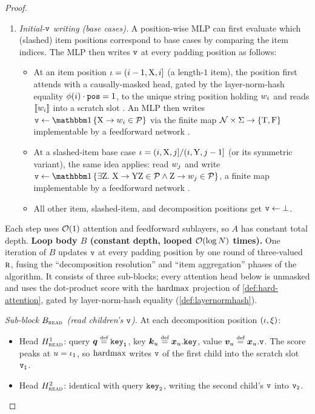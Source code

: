 \documentclass{article}
\begin{document}
\begin{proof}
\begin{enumerate}[noitemsep,topsep=0pt,leftmargin=18pt,parsep=0pt]
        \item \emph{Initial-${\mathtt{v}}$ writing (base cases).} 
        A position-wise MLP can first evaluate which (slashed) item positions correspond to base cases by comparing the item indices. The MLP then writes ${\mathtt{v}}$ at every padding position as follows:
        \begin{itemize}[noitemsep,topsep=0pt,leftmargin=15pt,parsep=0pt]
            \item At an item position ${{ \iota}} = ({{ i}} - 1, {{ \mathrm{X}}}, {{ i}}]$ (a length-$1$ item), the position first attends with a causally-masked head, gated by the layer-norm-hash equality $\phi({{ i}}) \cdot {\mathtt{pos}} = 1$, to the unique string position holding ${w}_{{ i}}$ and reads ${{ \llbracket{w}_{{ i}}\rrbracket}}$ into a scratch slot \citep{merrill2024expressivepowertransformerschain}. An MLP then writes $\fv \gets \ind{\production{\NT{X}}{\sym_\idxi} \in \rules}$ via the finite map ${{ \mathcal{N}}} \times {{ \Sigma}} \to {{\{ {\mathbin{\mathrm{T}}}, {\mathbin{\mathrm{F}}}\}}}$ implementable by a feedforward network \citep{yang2025transformercookbook}.
            \item At a slashed-item base case ${{ \iota}} = ({{ i}}, {{ \mathrm{X}}}, {{ j}}] / ({{ i}}, {{ \mathrm{Y}}}, {{ j}} - 1]$ (or its symmetric variant), the same idea applies: read ${w}_{{ j}}$ and write $\fv \gets \ind{\exists \NT{Z}.\ \production{\NT{X}}{\NT{Y}\NT{Z}} \in \rules \land \production{\NT{Z}}{\sym_\idxj} \in \rules}$, a finite map implementable by a feedforward network \citep{yang2025transformercookbook}.
            \item All other item, slashed-item, and decomposition positions get ${\mathtt{v}} \gets \bot$.
        \end{itemize}
    \end{enumerate}
    Each step uses ${{ \mathcal{O}}}(1)$ attention and feedforward sublayers, so $A$ has constant total depth.
        \textbf{Loop body $B$ (constant depth, looped ${{ \mathcal{O}}}(\log {{ N}})$ times).}
        One iteration of $B$ updates ${\mathtt{v}}$ at every padding position by one round of three-valued ${\textsc{r}}$, fusing the ``decomposition resolution'' and ``item aggregation'' phases of the algorithm.
        It consists of three sub-blocks; every attention head below is unmasked and uses the dot-product score with the ${{\mathrm{hardmax}}}$ projection of \cref{def:hard-attention}, gated by layer-norm-hash equality (\cref{def:layernormhash}).
        
        \emph{Sub-block $B_{\textsc{read}}$ (read children's ${\mathtt{v}}$).}
        At each decomposition position $({{ \iota}}, {{\xi}})$:
        \begin{itemize}[noitemsep,topsep=0pt,leftmargin=15pt,parsep=0pt]
            \item Head $H^1_{\textsc{read}}$: query $\vq \defeq \fkeychildone$, key $\vk_u \defeq \vx_u.\fkeyself$, value $\vv_u \defeq \vx_u.\fv$. The score peaks at $u = {{ \iota}}_1$, so ${{\mathrm{hardmax}}}$ writes ${\mathtt{v}}$ of the first child into the scratch slot ${\mathtt{v}_\mathtt{1}}$.
            \item Head $H^2_{\textsc{read}}$: identical with query ${\mathtt{key}_\mathtt{2}}$, writing the second child's ${\mathtt{v}}$ into ${\mathtt{v}_\mathtt{2}}$.
        \end{itemize}
        

\end{proof}
\end{document}

